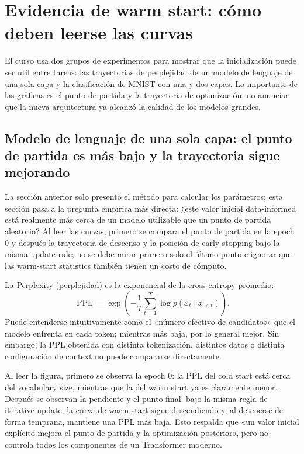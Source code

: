 \section{Evidencia de warm start: cómo deben leerse las curvas}

El curso usa dos grupos de experimentos para mostrar que la inicialización puede ser útil entre tareas: las trayectorias de perplejidad de un modelo de lenguaje de una sola capa y la clasificación de MNIST con una y dos capas. Lo importante de las gráficas es el punto de partida y la trayectoria de optimización, no anunciar que la nueva arquitectura ya alcanzó la calidad de los modelos grandes.

\subsection{Modelo de lenguaje de una sola capa: el punto de partida es más bajo y la trayectoria sigue mejorando}

La sección anterior solo presentó el método para calcular los parámetros; esta sección pasa a la pregunta empírica más directa: ¿este valor inicial data-informed está realmente más cerca de un modelo utilizable que un punto de partida aleatorio? Al leer las curvas, primero se compara el punto de partida en la epoch 0 y después la trayectoria de descenso y la posición de early-stopping bajo la misma update rule; no se debe mirar primero solo el último punto e ignorar que las warm-start statistics también tienen un costo de cómputo.

La Perplexity (perplejidad) es la exponencial de la cross-entropy promedio:
\[
\operatorname{PPL}=\exp\!\left(-\frac{1}{T}\sum_{t=1}^{T}\log p(x_t\mid x_{<t})\right).
\]
Puede entenderse intuitivamente como el «número efectivo de candidatos» que el modelo enfrenta en cada token; mientras más baja, por lo general mejor. Sin embargo, la PPL obtenida con distinta tokenización, distintos datos o distinta configuración de context no puede compararse directamente.


Al leer la figura, primero se observa la epoch 0: la PPL del cold start está cerca del vocabulary size, mientras que la del warm start ya es claramente menor. Después se observan la pendiente y el punto final: bajo la misma regla de iterative update, la curva de warm start sigue descendiendo y, al detenerse de forma temprana, mantiene una PPL más baja. Esto respalda que «un valor inicial explícito mejora el punto de partida y la optimización posterior», pero no controla todos los componentes de un Transformer moderno.

